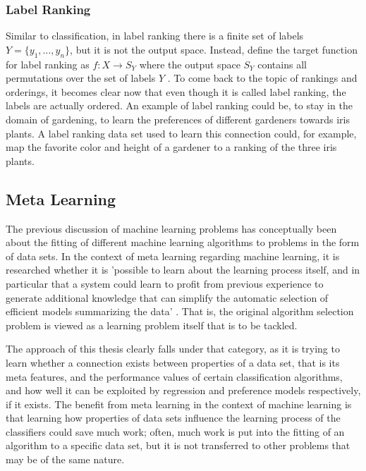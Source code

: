 \subsubsection{Label Ranking}
Similar to classification, in label ranking there is a finite set of labels $Y=\lbrace y_1,\dots,y_n \rbrace$, but it is not the output space. Instead, \citeauthor{DBLP:books/daglib/0025729} define the target function for label ranking as $f:X\rightarrow S_Y$ where the output space $S_Y$ contains all permutations over the set of labels $Y$ \cite{DBLP:books/daglib/0025729}. To come back to the topic of rankings and orderings, it becomes clear now that even though it is called label ranking, the labels are actually ordered. An example of label ranking could be, to stay in the domain of gardening, to learn the preferences of different gardeners towards iris plants. A label ranking data set used to learn this connection could, for example, map the favorite color and height of a gardener to a ranking of the three iris plants. 

\subsection{Meta Learning}
The previous discussion of machine learning problems has conceptually been about the fitting of different machine learning algorithms to problems in the form of data sets. In the context of meta learning regarding machine learning, it is researched whether it is 'possible to learn about the learning process itself, and in particular that a system could learn to profit from previous experience to generate additional knowledge that can simplify the automatic selection of efficient models summarizing the data' \cite{brazdil2008metalearning}. That is, the original algorithm selection problem \cite{rice1976algorithm} is viewed as a learning problem itself that is to be tackled.

The approach of this thesis clearly falls under that category, as it is trying to learn whether a connection exists between properties of a data set, that is its meta features, and the performance values of certain classification algorithms, and how well it can be exploited by regression and preference models respectively, if it exists. The benefit from meta learning in the context of machine learning is that learning how properties of data sets influence the learning process of the classifiers could save much work; often, much work is put into the fitting of an algorithm to a specific data set, but it is not transferred to other problems that may be of the same nature.

